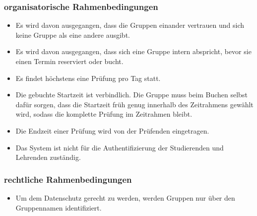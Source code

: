\subsubsection{organisatorische Rahmenbedingungen}
\begin{itemize}
  \item Es wird davon ausgegangen, dass die Gruppen einander vertrauen und sich keine Gruppe als eine andere ausgibt.
  \item Es wird davon ausgegangen, dass sich eine Gruppe intern abspricht, bevor sie einen Termin reserviert oder bucht.
  \item Es findet höchstens eine Prüfung pro Tag statt.
  \item Die gebuchte Startzeit ist verbindlich. Die Gruppe muss beim Buchen selbst dafür sorgen, dass die Startzeit früh genug innerhalb des Zeitrahmens gewählt wird, sodass die komplette Prüfung im Zeitrahmen bleibt.
  \item Die Endzeit einer Prüfung wird von der Prüfenden eingetragen.
  \item Das System ist nicht für die Authentifizierung der Studierenden und Lehrenden zuständig.
\end{itemize}

\subsubsection{rechtliche Rahmenbedingungen}
\begin{itemize}
  \item Um dem Datenschutz gerecht zu werden, werden Gruppen nur über den Gruppennamen identifiziert.
\end{itemize}
